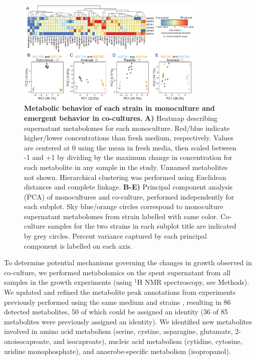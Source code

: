 \documentclass[11pt,twocolumn,notitlepage,openany,twoside]{book}
\begin{document}
\begin{refsection}
\begin{figure}[t]
\centering
\includegraphics[width=0.8\textwidth]{ch2_fig3}
\caption[Metabolic behavior of each strain in monoculture and emergent behavior in co-cultures.]{\textbf{Metabolic behavior of each strain in monoculture and emergent behavior in co-cultures.} \textbf{A)} Heatmap describing supernatant metabolomes for each monoculture. Red/blue indicate higher/lower concentrations than fresh medium, respectively. Values are centered at 0 using the mean in fresh media, then scaled between -1 and +1 by dividing by the maximum change in concentration for each metabolite in any sample in the study. Unnamed metabolites not shown. Hierarchical clustering was performed using Euclidean distances and complete linkage. \textbf{B-E)} Principal component analysis (PCA) of monocultures and co-culture, performed independently for each subplot. Sky blue/orange circles correspond to monoculture supernatant metabolomes from strain labelled with same color. Co-culture samples for the two strains in each subplot title are indicated by grey circles. Percent variance captured by each principal component is labelled on each axis.}
\end{figure}

To determine potential mechanisms governing the changes in growth observed in co-culture, we performed metabolomics on the spent supernatant from all samples in the growth experiments (using  $^1\!$H NMR spectroscopy, see Methods). We updated and refined the metabolite peak annotations from experiments previously performed using the same medium and strains \cite{Biggs2017-fs}, resulting in 86 detected metabolites, 50 of which could be assigned an identity (36 of 85 metabolites were previously assigned an identity). We identified new metabolites involved in amino acid metabolism (serine, cystine, asparagine, glutamate, 2-oxoisocaproate, and isocaproate), nucleic acid metabolism (cytidine, cytosine, uridine monophosphate), and anaerobe-specific metabolism (isopropanol).


\end{refsection}
\end{document}

